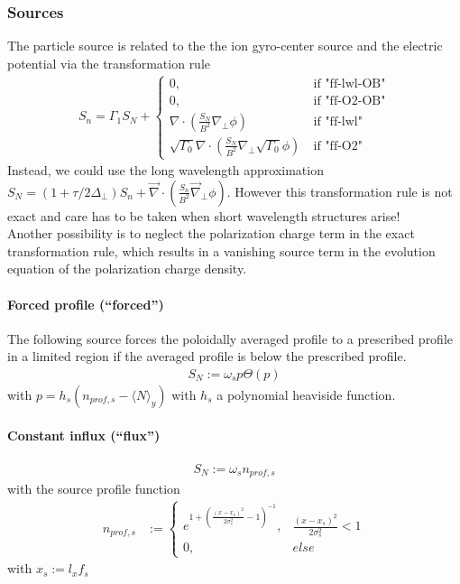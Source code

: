\subsubsection{Sources}
The particle source is related to the the ion gyro-center source 
and the electric potential via the transformation rule
\begin{align}
 S_n =\Gamma_1 S_N +
 \begin{cases}
0, 
        &\ \text{if "ff-lwl-OB"} \\
0, 
      &\ \text{if "ff-O2-OB"} \\
\nabla\cdot \left(\frac{S_N}{B^2} \nabla_\perp \phi\right)
       &\ \text{if "ff-lwl"} \\
\sqrt{\Gamma_0}\nabla\cdot \left(\frac{S_N}{B^2} \nabla_\perp\sqrt{\Gamma_0} 
\phi\right) 
         &\ \text{if "ff-O2"} 
\end{cases}
\end{align}
Instead, we could use the long wavelength approximation \(
S_N =(1+\tau/2 \Delta_\perp) S_n + \vec{\nabla} \cdot \left(\frac{S_n}{B^2} 
\vec{\nabla}_\perp \phi\right)\). However this transformation rule is not exact 
and care has to be taken when short wavelength structures arise! \\
Another possibility is to neglect the polarization charge term in the exact transformation rule, which results in a vanishing source term in the evolution equation of the polarization charge density.
\paragraph{Forced profile (``forced'')}
The following source forces the poloidally averaged profile to a prescribed profile in a limited region if the averaged profile is below the prescribed profile. 
\begin{align}
 S_N := \omega_s p \Theta\left(p \right)
\end{align}
with \(p = h_s (n_{prof,s} - \langle N \rangle_y)\) with \(h_s\) a polynomial heaviside function.

\paragraph{Constant influx (``flux'')}
\begin{align}
 S_N := \omega_s n_{prof,s} 
\end{align}
with the source profile function 
\begin{align}
 n_{prof,s}&:= 
 \begin{cases}
   e^{1+\left(\frac{(x-x_s)^2}{2 \sigma_s^2}-1\right)^{-1}}, &\frac{(x-x_s)^2}{2 
\sigma_s^2}<1  \\
   0, & else
 \end{cases}
\end{align}
with \(x_s:= l_x  f_s\)
